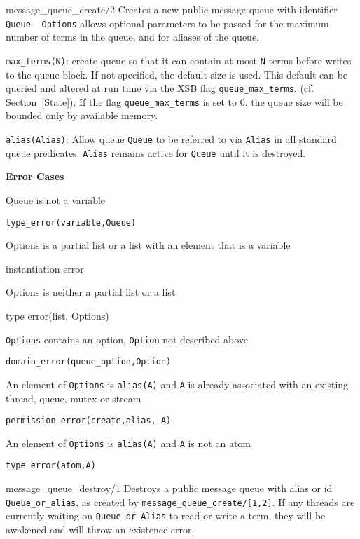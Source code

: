 \begin{description}
{message\_queue\_create/2}
%
Creates a new public message queue with identifier {\tt Queue}.  {\tt
  Options} allows optional parameters to be passed for the maximum
number of terms in the queue, and for aliases of the queue.
%
\bi
\item {\tt max\_terms(N)}: create queue so that it can contain at most
  {\tt N} terms before writes to the queue block.  If not specified,
  the default size is used.  This default can be queried and altered
  at run time via the XSB flag {\tt queue\_max\_terms}.
  (cf. Section~\ref{State}).  If the flag {\tt queue\_max\_terms} is
  set to 0, the queue size will be bounded only by available memory.
%
\item {\tt alias(Alias)}: Allow queue {\tt Queue} to be referred to
  via {\tt Alias} in all standard queue predicates.  {\tt Alias}
  remains active for {\tt Queue} until it is destroyed.
\ei

{\bf Error Cases}
\bi
\item 	Queue is not a variable
\bi
\item 	{\tt type\_error(variable,Queue)}
\ei
\item Options is a partial list or a list with an element that is a
  variable 
\bi
\item  instantiation error
\ei
\item Options is neither a partial list or a list
\bi
\item  type error(list, Options)
\ei
\item 	{\tt Options} contains an option, {\tt Option} not described above
\bi
\item 	{\tt domain\_error(queue\_option,Option)}
\ei
%
\item An element of {\tt Options} is {\tt alias(A)} and {\tt A} is
  already associated with an existing thread, queue, mutex or stream 
\bi
\item {\tt permission\_error(create,alias, A)}
\ei
\item An element of {\tt Options} is {\tt alias(A)} and {\tt A} is not an atom
\bi
\item {\tt type\_error(atom,A)}
\ei
\ei

{message\_queue\_destroy/1}
%
Destroys a public message queue with alias or id {\tt
  Queue\_or\_alias}, as created by {\tt message\_queue\_create/[1,2]}.
If any threads are currently waiting on {\tt Queue\_or\_Alias} to read
or write a term, they will be awakened and will throw an existence
error.


\end{description}
